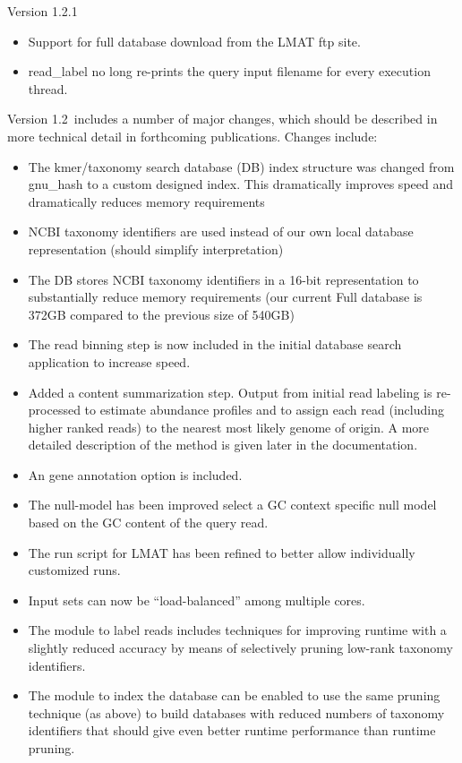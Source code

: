 \documentclass[11pt]{article}
\begin{document}
Version 1.2.1
\begin{itemize}
\item
Support for full database download from the LMAT ftp site.
\item
read\_label no long re-prints the query input filename for every execution thread.
\end{itemize}



Version 1.2~includes a number of major changes, which should be described in more technical detail in forthcoming publications.  Changes include:
\begin{itemize}
\item The kmer/taxonomy search database (DB) index structure was changed from gnu\_hash to a custom designed index.
This dramatically improves speed and dramatically reduces memory requirements
\item NCBI taxonomy identifiers are used instead of our own local database representation (should simplify interpretation)
\item The DB stores NCBI taxonomy identifiers in a 16-bit representation to substantially reduce memory requirements
(our current Full database is 372GB compared to the previous size of 540GB)
\item The read binning step is now included in the initial database search application to increase speed.
\item Added a content summarization step.  Output from initial read labeling is re-processed to estimate abundance profiles
and to assign each read (including higher ranked reads) to the nearest most likely genome of origin. A more detailed description
of the method is given later in the documentation.
\item An gene annotation option is included.
\item The null-model has been improved select a GC context specific null model based on the GC content of the query read.
\item The run script for LMAT has been refined to better allow individually customized runs.
\item Input sets can now be ``load-balanced'' among multiple cores. 
\item The module to label reads includes techniques for improving runtime with a slightly reduced accuracy by means of selectively pruning low-rank taxonomy identifiers.  
\item The module to index the database can be enabled to use the same pruning technique (as above) to build databases with reduced numbers of taxonomy identifiers that should give even better runtime performance than runtime pruning.

\end{itemize}
\end{document}
